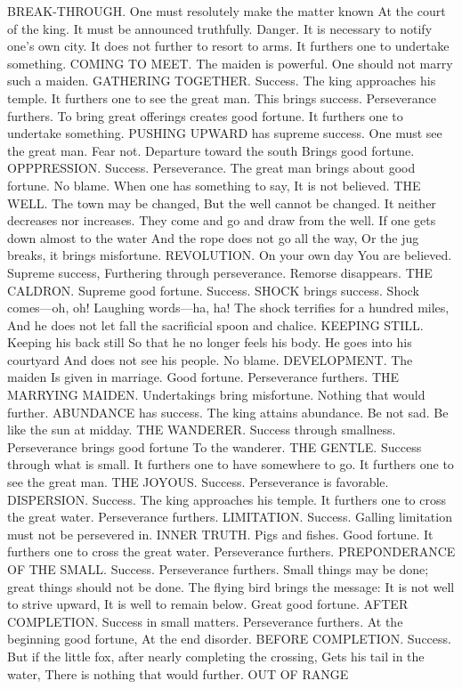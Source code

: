 {\or
BREAK-THROUGH. One must resolutely make the matter known
At the court of the king.
It must be announced truthfully. Danger.
It is necessary to notify one’s own city.
It does not further to resort to arms.
It furthers one to undertake something.
\or
COMING TO MEET. The maiden is powerful.
One should not marry such a maiden.
\or
GATHERING TOGETHER. Success.
The king approaches his temple.
It furthers one to see the great man.
This brings success. Perseverance furthers.
To bring great offerings creates good fortune.
It furthers one to undertake something.
\or
PUSHING UPWARD has supreme success.
One must see the great man.
Fear not.
Departure toward the south
Brings good fortune.
\or
OPPPRESSION. Success. Perseverance.
The great man brings about good fortune.
No blame.
When one has something to say,
It is not believed.
\or
THE WELL. The town may be changed,
But the well cannot be changed.
It neither decreases nor increases.
They come and go and draw from the well.
If one gets down almost to the water
And the rope does not go all the way,
Or the jug breaks, it brings misfortune.
\or
REVOLUTION. On your own day
You are believed.
Supreme success,
Furthering through perseverance.
Remorse disappears.
\or
THE CALDRON. Supreme good fortune.
Success.
\or
SHOCK brings success.
Shock comes—oh, oh!
Laughing words—ha, ha!
The shock terrifies for a hundred miles,
And he does not let fall the sacrificial spoon and chalice.
\or
KEEPING STILL. Keeping his back still
So that he no longer feels his body.
He goes into his courtyard
And does not see his people.
No blame.
\or
DEVELOPMENT. The maiden
Is given in marriage.
Good fortune.
Perseverance furthers.
\or
THE MARRYING MAIDEN.
Undertakings bring misfortune.
Nothing that would further.
\or
ABUNDANCE has success.
The king attains abundance.
Be not sad.
Be like the sun at midday.
\or
THE WANDERER. Success through smallness.
Perseverance brings good fortune
To the wanderer.
\or
THE GENTLE. Success through what is small.
It furthers one to have somewhere to go.
It furthers one to see the great man.
\or
THE JOYOUS. Success.
Perseverance is favorable.
\or
DISPERSION. Success.
The king approaches his temple.
It furthers one to cross the great water.
Perseverance furthers.
\or
LIMITATION. Success.
Galling limitation must not be persevered in.
\or
INNER TRUTH. Pigs and fishes.
Good fortune.
It furthers one to cross the great water.
Perseverance furthers.
\or
PREPONDERANCE OF THE SMALL. Success.
Perseverance furthers.
Small things may be done; great things should not be done.
The flying bird brings the message:
It is not well to strive upward,
It is well to remain below.
Great good fortune.
\or
AFTER COMPLETION. Success in small matters.
Perseverance furthers.
At the beginning good fortune,
At the end disorder.
\or
BEFORE COMPLETION. Success.
But if the little fox, after nearly completing the crossing,
Gets his tail in the water,
There is nothing that would further.
\else OUT OF RANGE
\fi}
